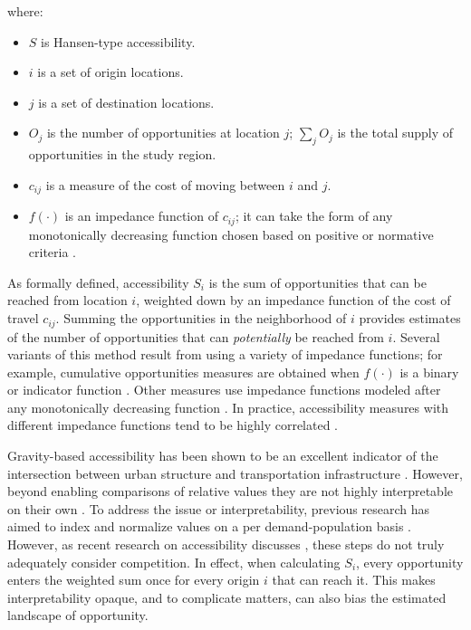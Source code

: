 \documentclass[]{elsarticle} %
\providecommand{\tightlist}{%
  \setlength{\itemsep}{0pt}\setlength{\parskip}{0pt}}
\begin{document}
\noindent where:

\begin{itemize}
\tightlist
\item
  \(S\) is Hansen-type accessibility.
\item
  \(i\) is a set of origin locations.
\item
  \(j\) is a set of destination locations.
\item
  \(O_j\) is the number of opportunities at location \(j\);
  \(\sum_j O_j\) is the total supply of opportunities in the study
  region.
\item
  \(c_{ij}\) is a measure of the cost of moving between \(i\) and \(j\).
\item
  \(f(\cdot)\) is an impedance function of \(c_{ij}\); it can take the
  form of any monotonically decreasing function chosen based on positive
  or normative criteria \citep{paez2012measuring}.
\end{itemize}

As formally defined, accessibility \(S_i\) is the sum of opportunities
that can be reached from location \(i\), weighted down by an impedance
function of the cost of travel \(c_{ij}\). Summing the opportunities in
the neighborhood of \(i\) provides estimates of the number of
opportunities that can \emph{potentially} be reached from \(i\). Several
variants of this method result from using a variety of impedance
functions; for example, cumulative opportunities measures are obtained
when \(f(\cdot)\) is a binary or indicator function
\citep[e.g.,][]{elgeneidy_cost_2016, rosik_forecast_2021, geurs2004, qi_decadelong_2018}.
Other measures use impedance functions modeled after any monotonically
decreasing function \citep[e.g., Gaussian, inverse power, negative
exponential, or log-normal, among others, see, \emph{inter
alia},][]{kwan_spacetime_1998, vale_influence_2017, reggiani_accessibility_2011, li_approach_2020}.
In practice, accessibility measures with different impedance functions
tend to be highly correlated
\citep{higgins2019, santanapalacios2022, kwan_spacetime_1998}.

Gravity-based accessibility has been shown to be an excellent indicator
of the intersection between urban structure and transportation
infrastructure
\citep{shi_literature_2020, reggiani_accessibility_2011, kwan_spacetime_1998}.
However, beyond enabling comparisons of relative values they are not
highly interpretable on their own \citep{miller2018}. To address the
issue or interpretability, previous research has aimed to index and
normalize values on a per demand-population basis
\citep[e.g.,][]{barboza_balancing_2021, pereira_distributional_2019, wang_access_2021}.
However, as recent research on accessibility discusses
\citep{merlin2017competition, allen2019, paez2019, kelobonye2020measuring},
these steps do not truly adequately consider competition. In effect,
when calculating \(S_i\), every opportunity enters the weighted sum once
for every origin \(i\) that can reach it. This makes interpretability
opaque, and to complicate matters, can also bias the estimated landscape
of opportunity.
\end{document}
